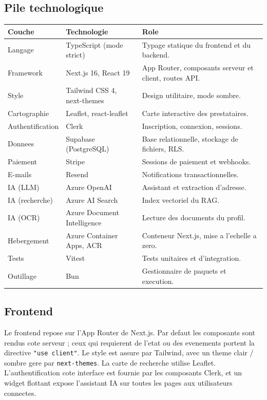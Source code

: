 \documentclass[11pt,a4paper]{article}
\begin{document}
\subsection{Pile technologique}
\begin{tabularx}{\linewidth}{@{}llX@{}}
\toprule
\textbf{Couche} & \textbf{Technologie} & \textbf{Role} \\
\midrule
Langage & TypeScript (mode strict) & Typage statique du frontend et du backend. \\
Framework & Next.js 16, React 19 & App Router, composants serveur et client, routes API. \\
Style & Tailwind CSS 4, next-themes & Design utilitaire, mode sombre. \\
Cartographie & Leaflet, react-leaflet & Carte interactive des prestataires. \\
Authentification & Clerk & Inscription, connexion, sessions. \\
Donnees & Supabase (PostgreSQL) & Base relationnelle, stockage de fichiers, RLS. \\
Paiement & Stripe & Sessions de paiement et webhooks. \\
E-mails & Resend & Notifications transactionnelles. \\
IA (LLM) & Azure OpenAI & Assistant et extraction d'adresse. \\
IA (recherche) & Azure AI Search & Index vectoriel du RAG. \\
IA (OCR) & Azure Document Intelligence & Lecture des documents du profil. \\
Hebergement & Azure Container Apps, ACR & Conteneur Next.js, mise a l'echelle a zero. \\
Tests & Vitest & Tests unitaires et d'integration. \\
Outillage & Bun & Gestionnaire de paquets et execution. \\
\bottomrule
\end{tabularx}

\subsection{Frontend}
Le frontend repose sur l'App Router de Next.js. Par defaut les composants sont
rendus cote serveur ; ceux qui requierent de l'etat ou des evenements portent la
directive \texttt{"use client"}. Le style est assure par Tailwind, avec un theme
clair / sombre gere par \texttt{next-themes}. La carte de recherche utilise
Leaflet. L'authentification cote interface est fournie par les composants Clerk,
et un widget flottant expose l'assistant IA sur toutes les pages aux utilisateurs
connectes.
\end{document}
